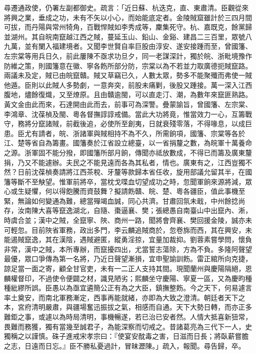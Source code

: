 \begin{pinyinscope}
尋遷通政使，仍署左副都御史。疏言：「近日蘇、杭迭克，直、東肅清。臣觀從來將興之業，垂成之功，未有不矢以小心，而始能底定者。金陵賊窟雖計於三四月間可拔，而丹陽與常州犄角，百戰悍賊如李秀成等，麇集死守。杭、嘉既克，餘黨歸並湖州。其自皖南竄越江西之賊，蔓延玉山、鉛山、金谿、建昌二三百里，眾號八九萬，並有闌入福建境者。又聞李世賢自率巨股由淳安、遂安接踵而至，曾國籓、左宗棠等用兵日久，前此屢陳不亟求功旦夕，同一老謀深計，獨於皖、浙毗境豫作防維之策，則國籓意在徽、寧各飭所部分防，宗棠以為不若並力取廣德扼賊竄路。兩議未及定，賊已由皖竄贛。賊又草竊已久，人數太眾，勢多不能聚殲而弗使一賊他遁。臣則以此賊人多勢劇，一意奔突，前股未痛剿，後股又踵接。萬一深入江西腹地，燼餘復熾，又至燎原。且由贛逾閩，可以直走汀、潮，為數年來竄匪熟路。黃文金由此而來，石達開由此而去，前事可為深警。疊蒙諭旨，曾國籓、左宗棠、李鴻章、沈葆楨及閩、粵各督撫諄諄戒備。當此大功將竟，惟當效力一心，互籌戰守，務將分竄諸賊，前截後追，必使所至創夷，日就衰殘零落，不得喙息，以成巨患。臣尤有請者，皖、浙諸軍與賊相持不為不久，所需餉項，國籓、宗棠等各於江、楚等省自為籌畫。國籓奏於江省設立總臺，以一省捐釐之數，為皖軍十萬養命之源。浙軍固不能分撥，即國籓所部月餉，傳聞亦祗放數成，不得已而籌及廣東釐捐，乃又不能遽辦。夫民之不能見遠而各為其私者，情也。廣東有之，江西豈獨不然？日前沈葆楨奏請將江西茶稅、牙釐等款歸本省任收，旋用部議允留其半，在國籓等斷不至觖望。惟軍前將卒，當枕戈喋血切望成功之時，忽聞軍餉來源將減，眾心或生疑懼，何以得飽騰而資鼓舞？擬請飭贛、皖、楚、粵各疆臣，值此事機至緊，無論如何變通為難，總當殫竭血誠，同心共濟。甘肅回氛未戢，中州餘捻尚存，汝南陳大喜等竄逸湖北，自隨、棗逼襄、樊；張總愚自南臺山中出竄內、淅，時虞合並；漢中之賊，全竄寧、陜、商州一路，聞將會齊襄、樊回援金陵，誠亦未可輕忽。目前陜省軍務，政出多門，李云麟追賊商於，忽卷旆而西，其在興安，未能遏賊竄逸，其在漢陰，遇賊避匿，縱勇淫掠，宜量加裁抑。劉蓉素嘗學問，懷負非常，漢中之賊，本所專辦，而竄擾四出，尤當誓志蕩除，方為不負。多隆阿聲望最優，眾口爭傳為第一名將，乃近日聲望漸損，宜申聖諭訓飭。雷正綰所向克捷，諒足當一面之寄，顧全甘官吏，未有一二正人支持其間。現聞蘭州與慶陽隔絕，恩麟權督印，不過使令便闢之材，識見陋劣；熙麟坐守慶陽、寧夏一區，又為慶昀種種紕繆所誤。臣愚以為亟宜遴簡公正有為之大臣，鎮撫整飭。今之天下，何易遽言率土奠安，而南北軍務漸定，西事再能就緒，亦即為大致之澄清。朝廷者天下之本，宮府清明嚴肅，與疆場奮迅振拔之氣，相感而自通。天下大勢日轉，而亦正多難鉅之事，或遽以為時局清明，事機暢遂，若已治已安者然。人情大抵喜新狃常，畏難而務獲，獨有當幾至誠君子，為能深察而切戒之。昔諸葛亮為三代下一人，史獨稱之以謹慎。硃子進戒宋孝宗曰：『使宴安酖毒之害，日滋而日長；將臥薪嘗膽之志，日遠而日忘。』臣不勝私憂過計，冒昧瀝陳。」疏入，報聞。尋告歸，卒。


\end{pinyinscope}
